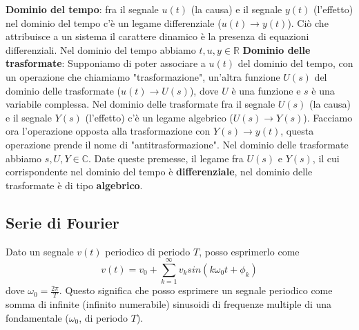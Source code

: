 \textbf{Dominio del tempo}: fra il segnale $u(t)$ (la causa) e il segnale $y(t)$ (l'effetto) nel dominio del tempo c'è un legame differenziale ($u(t) \rightarrow y(t)$). Ciò che attribuisce a un sistema il carattere dinamico è la presenza di equazioni differenziali. Nel dominio del tempo abbiamo $t,u,y \in \mathbb{R}$\newline
\newline
\textbf{Dominio delle trasformate}: Supponiamo di poter associare a $u(t)$ del dominio del tempo, con un operazione che chiamiamo "trasformazione", un'altra funzione $U(s)$ del dominio delle trasformate ($u(t) \rightarrow U(s)$), dove $U$ è una funzione e $s$ è una variabile complessa. Nel dominio delle trasformate fra il segnale $U(s)$ (la causa) e il segnale $Y(s)$ (l'effetto) c'è un legame algebrico ($U(s) \rightarrow  Y(s)$). Facciamo ora l'operazione opposta alla trasformazione con $Y(s)\rightarrow y(t)$, questa operazione prende il nome di "antitrasformazione". Nel dominio delle trasformate abbiamo $s, U ,Y \in \mathbb{C}$.\newline
\newline
Date queste premesse, il legame fra $U(s)$ e $Y(s)$, il cui corrispondente nel dominio del tempo è \textbf{differenziale}, nel dominio delle trasformate è di tipo \textbf{algebrico}.
\subsection{Serie di Fourier}
Dato un segnale $v(t)$ periodico di periodo $T$, posso esprimerlo come 
\[
    v(t)= v_0 + \sum_{k=1}^{\infty} v_k sin(k \omega_0 t + \phi_k)
\]
dove $\omega_0 = \frac{2\pi}{T}$. Questo significa che posso esprimere un segnale periodico come somma di infinite (infinito numerabile) sinusoidi di frequenze multiple di una fondamentale ($\omega_0$, di periodo $T$).
